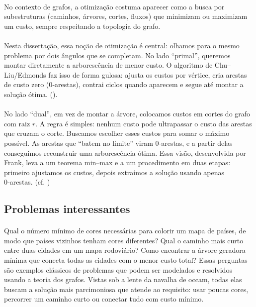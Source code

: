 \documentclass[12pt,a4paper]{article}
\begin{document}
\paragraph{}
No contexto de grafos, a otimização costuma aparecer como a busca por subestruturas (caminhos, árvores, cortes, fluxos) que minimizam ou maximizam um custo, sempre respeitando a topologia do grafo.

\paragraph{}
Nesta dissertação, essa noção de otimização é central: olhamos para o mesmo problema por dois ângulos que se completam. No lado “primal”, queremos montar diretamente a arborescência de menor custo. O algoritmo de Chu–Liu/Edmonds faz isso de forma gulosa: ajusta os custos por vértice, cria arestas de custo zero (0‑arestas), contrai ciclos quando aparecem e segue até montar a solução ótima. 
(\cite{chu1965,edmonds1967optimum}).

\paragraph{}
No lado “dual”, em vez de montar a árvore, colocamos custos em cortes do grafo com raiz $r$. A regra é simples: nenhum custo pode ultrapassar o custo das arestas que cruzam o corte. Buscamos escolher esses custos para somar o máximo possível. As arestas que “batem no limite” viram 0‑arestas, e a partir delas conseguimos reconstruir uma arborescência ótima. Essa visão, desenvolvida por Frank, leva a um teorema min–max e a um procedimento em duas etapas: primeiro ajustamos os custos, depois extraímos a solução usando apenas 0‑arestas. 
(cf. \cite{frank2014,schrijver2003comb})

\subsection{Problemas interessantes}

\paragraph{}
Qual o número mínimo de cores necessárias para colorir um mapa de países, de modo que países vizinhos tenham cores diferentes? Qual o caminho mais curto entre duas cidades em um mapa rodoviário? Como encontrar a árvore geradora mínima que conecta todas as cidades com o menor custo total? Essas perguntas são exemplos clássicos de problemas que podem ser modelados e resolvidos usando a teoria dos grafos. Vistas sob a lente da navalha de occam, todas elas buscam a solução mais parcimoniosa que atende ao requisito: usar poucas cores, percorrer um caminho curto ou conectar tudo com custo mínimo.
\end{document}

